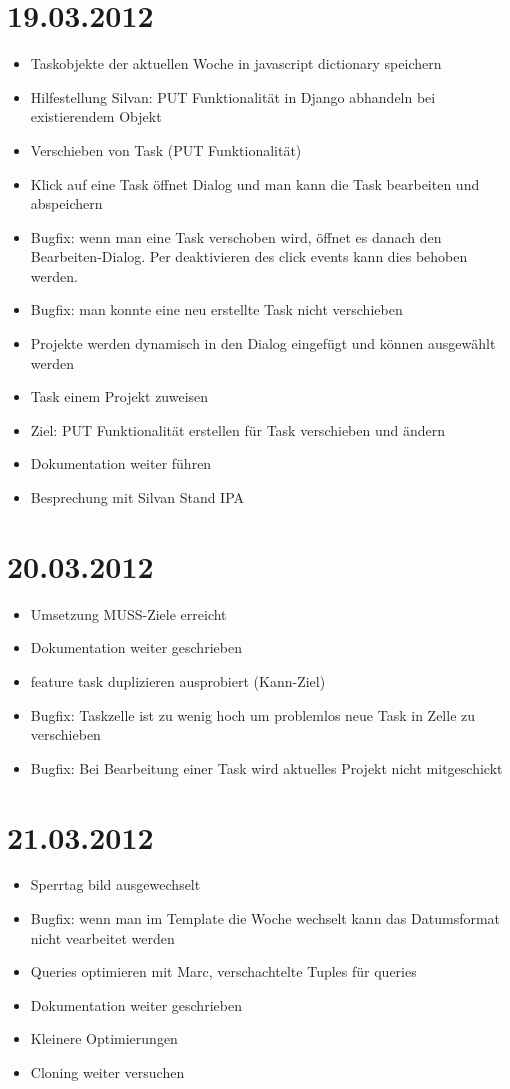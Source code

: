 \section{19.03.2012}
    \begin{itemize}
        \item Taskobjekte der aktuellen Woche in javascript dictionary speichern
        \item Hilfestellung Silvan: PUT Funktionalität in Django abhandeln bei existierendem Objekt
        \item Verschieben von Task (PUT Funktionalität)
        \item Klick auf eine Task öffnet Dialog und man kann die Task bearbeiten und abspeichern
        \item Bugfix: wenn man eine Task verschoben wird, öffnet es danach den Bearbeiten-Dialog. Per deaktivieren des click events kann dies behoben werden.
        \item Bugfix: man konnte eine neu erstellte Task nicht verschieben
        \item Projekte werden dynamisch in den Dialog eingefügt und können ausgewählt werden
        \item Task einem Projekt zuweisen
        \item Ziel: PUT Funktionalität erstellen für Task verschieben und ändern
        \item Dokumentation weiter führen
        \item Besprechung mit Silvan Stand IPA
    \end{itemize}
\section{20.03.2012}
    \begin{itemize}
        \item Umsetzung MUSS-Ziele erreicht
        \item Dokumentation weiter geschrieben
        \item feature task duplizieren ausprobiert (Kann-Ziel)
        \item Bugfix: Taskzelle ist zu wenig hoch um problemlos neue Task in Zelle zu verschieben
        \item Bugfix: Bei Bearbeitung einer Task wird aktuelles Projekt nicht mitgeschickt
    \end{itemize}
\section{21.03.2012}
    \begin{itemize}
        \item Sperrtag bild ausgewechselt
        \item Bugfix: wenn man im Template die Woche wechselt kann das Datumsformat nicht vearbeitet werden
        \item Queries optimieren mit Marc, verschachtelte Tuples für queries
        \item Dokumentation weiter geschrieben
        \item Kleinere Optimierungen
        \item Cloning weiter versuchen
    \end{itemize}
